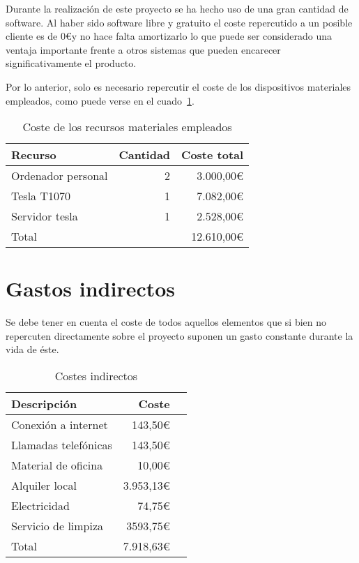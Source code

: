 Durante la realización de este proyecto se ha hecho uso de una gran cantidad de software. Al haber sido software libre y gratuito el coste repercutido a un posible cliente es de 0\euro y no hace falta amortizarlo lo que puede ser considerado una ventaja importante frente a otros sistemas que pueden encarecer significativamente el producto.

Por lo anterior, solo es necesario repercutir el coste de los dispositivos materiales empleados, como puede verse en el cuado~\ref{tab:re_mat}.

\begin{table}
	\centering
	
	\begin{tabular}{|l|r|r|}
		\hline
		Recurso & Cantidad & Coste total \\
		\hline
		Ordenador personal & 2 & 3.000,00\euro \\
		\hline
		Tesla T1070 & 1 & 7.082,00\euro \\
		\hline
		Servidor tesla & 1 & 2.528,00\euro\\
		\hline
		\hline
		\multicolumn{2}{|l|}{Total} & 12.610,00\euro\\
		\hline
	\end{tabular}
	\caption{Coste de los recursos materiales empleados}\label{tab:re_mat}
\end{table}

\section{Gastos indirectos}

Se debe tener en cuenta el coste de todos aquellos elementos que si bien no repercuten directamente sobre el proyecto suponen un gasto constante durante la vida de éste.

\begin{table}
	\centering
	
	\begin{tabular}{|l|r|r|}
		\hline
		Descripción & Coste \\
		\hline
		Conexión a internet & 143,50\euro \\
		\hline
		Llamadas telefónicas & 143,50\euro \\
		\hline
		Material de oficina & 10,00\euro\\
		\hline
		Alquiler local & 3.953,13\euro\\
		\hline
		Electricidad & 74,75\euro\\
		\hline
		Servicio de limpiza & 3593,75\euro\\
		
		\hline
		\hline
		Total & 7.918,63\euro\\
		\hline
	\end{tabular}
	\caption{Costes indirectos}\label{tab:cost_indi}
\end{table}

